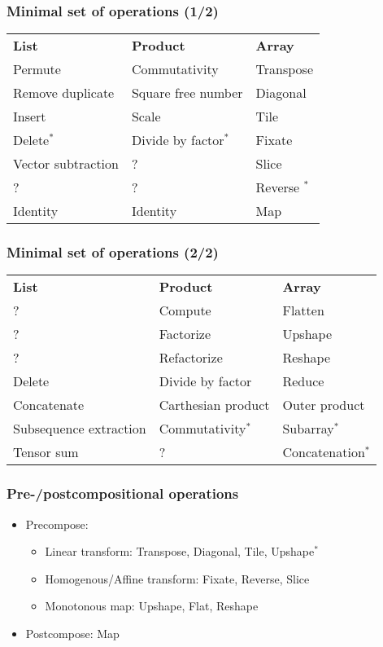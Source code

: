 \documentclass[xetex,mathserif,serif]{beamer}
\begin{document}
\begin{frame}
  \frametitle{Minimal set of operations (1/2)}
  
  \footnotesize
  \begin{center}
    \begin{tabular}{lll}
      \bfseries List & \bfseries Product & \bfseries Array  \\
      Permute & Commutativity  & Transpose  \\
      Remove duplicate & Square free number  & Diagonal  \\
      Insert & Scale  & Tile  \\
      Delete$^*$ & Divide by factor$^*$  & Fixate  \\
      Vector subtraction & ?  & Slice  \\
      ? & ? & Reverse $^*$  \\
      Identity & Identity & Map 
    \end{tabular}
  \end{center}
\end{frame}

\begin{frame}
  \frametitle{Minimal set of operations (2/2)}
  
  \footnotesize
  \begin{center}
    \begin{tabular}{lll}
      \bfseries List & \bfseries Product & \bfseries Array  \\
      ? & Compute & Flatten \\
      ? & Factorize & Upshape \\
      ? & Refactorize & Reshape \\
      Delete & Divide by factor & Reduce \\
      Concatenate & Carthesian product & Outer product \\
      Subsequence extraction & Commutativity$^*$ & Subarray$^*$ \\
      Tensor sum & ? & Concatenation$^*$
    \end{tabular}
  \end{center}
\end{frame}

\begin{frame}
  \frametitle{Pre-/postcompositional operations}
  
  \begin{itemize}
    \item Precompose:
    \begin{itemize}
      \item Linear transform: Transpose, Diagonal, Tile, Upshape$^*$
      \item Homogenous/Affine transform: Fixate, Reverse, Slice
      \item Monotonous map: Upshape, Flat, Reshape
    \end{itemize}
    \item Postcompose: Map
  \end{itemize}
\end{frame}
\end{document}
